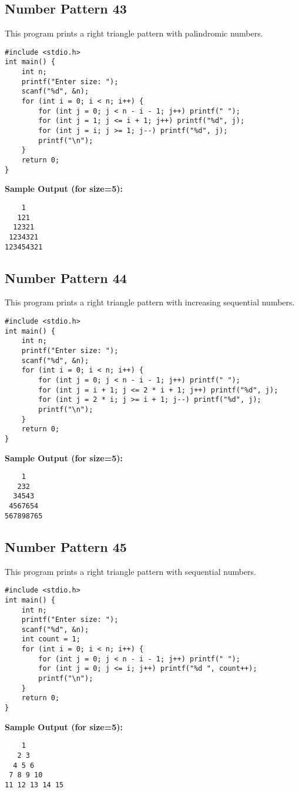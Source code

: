 \documentclass[a4paper,12pt]{article}
\begin{document}
\subsection{Number Pattern 43}
This program prints a right triangle pattern with palindromic numbers.
\begin{lstlisting}[caption={Number Pattern 43}]
#include <stdio.h>
int main() {
    int n;
    printf("Enter size: ");
    scanf("%d", &n);
    for (int i = 0; i < n; i++) {
        for (int j = 0; j < n - i - 1; j++) printf(" ");
        for (int j = 1; j <= i + 1; j++) printf("%d", j);
        for (int j = i; j >= 1; j--) printf("%d", j);
        printf("\n");
    }
    return 0;
}
\end{lstlisting}
\textbf{Sample Output (for size=5):}
\begin{verbatim}
    1
   121
  12321
 1234321
123454321
\end{verbatim}
\clearpage

\subsection{Number Pattern 44}
This program prints a right triangle pattern with increasing sequential numbers.
\begin{lstlisting}[caption={Number Pattern 44}]
#include <stdio.h>
int main() {
    int n;
    printf("Enter size: ");
    scanf("%d", &n);
    for (int i = 0; i < n; i++) {
        for (int j = 0; j < n - i - 1; j++) printf(" ");
        for (int j = i + 1; j <= 2 * i + 1; j++) printf("%d", j);
        for (int j = 2 * i; j >= i + 1; j--) printf("%d", j);
        printf("\n");
    }
    return 0;
}
\end{lstlisting}
\textbf{Sample Output (for size=5):}
\begin{verbatim}
    1
   232
  34543
 4567654
567898765
\end{verbatim}
\clearpage

\subsection{Number Pattern 45}
This program prints a right triangle pattern with sequential numbers.
\begin{lstlisting}[caption={Number Pattern 45}]
#include <stdio.h>
int main() {
    int n;
    printf("Enter size: ");
    scanf("%d", &n);
    int count = 1;
    for (int i = 0; i < n; i++) {
        for (int j = 0; j < n - i - 1; j++) printf(" ");
        for (int j = 0; j <= i; j++) printf("%d ", count++);
        printf("\n");
    }
    return 0;
}
\end{lstlisting}
\textbf{Sample Output (for size=5):}
\begin{verbatim}
    1 
   2 3 
  4 5 6 
 7 8 9 10 
11 12 13 14 15 
\end{verbatim}
\clearpage
\end{document}
